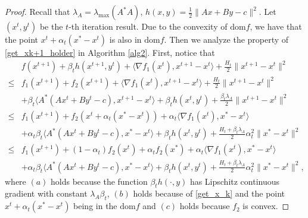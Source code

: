 \documentclass{article}
\numberwithin{equation}{section}
\begin{document}
\begin{proof}
    Recall that $\lambda_{A} = \lambda_{\max}(A^*A)$, $h(x,y) =\frac{1}{2}\|Ax+By-c\rVert^2$.  
    Let $(x^t,y^t)$ be the $t$-th iteration result. Due to the convexity of $\mathrm{dom}f$, 
    we have that the point $x^t + \alpha_t(x^*-x^t)$ is also in $\mathrm{dom}f$.   
    Then we  analyze the property of \eqref{get_xk+1_holder} in Algorithm \ref{alg2}. 
    First, notice that 
    \begin{align}
        &f(x^{t+1})+\beta_th(x^{t+1},y^t) +\langle \nabla f_1(x^t), x^{t+1}-x^t\rangle +\frac{H_t}{2}\|x^{t+1}-x^t\rVert^2 \nonumber \\
        \overset{\mathop{(a)}}{\leq} & f_1(x^{t+1})+f_2(x^{t+1}) +\langle \nabla f_1(x^t), x^{t+1}-x^t\rangle +\frac{H_t}{2}\|x^{t+1}-x^t\rVert^2 
         \nonumber \\
        &+\beta_t\langle A^*(Ax^t+By^t-c), x^{t+1}-x^t\rangle +\beta_th(x^t,y^t) +\frac{\beta_t\lambda_A}{2}\| x^{t+1}-x^t\rVert^2 \nonumber\\
        \overset{\mathop{(b)}}{\leq}& f_1(x^{t+1})+ f_2(x^t+\alpha_t(x^*-x^t)) +\alpha_t\langle \nabla f_1(x^t), x^*-x^t\rangle  \nonumber \\
        &+\alpha_t\beta_t\langle A^*(Ax^t+By^t-c), x^*-x^t\rangle + \beta_th(x^t,y^t) + 
        \frac{H_t+\beta_t\lambda_A}{2}\alpha_t^2\|x^*-x^t\rVert^2 \nonumber \\
        \overset{\mathop{(c)}}{\leq} & f_1(x^{t+1})+ (1-\alpha_t)f_2(x^t)+\alpha_tf_2(x^*) +\alpha_t\langle \nabla f_1(x^t), x^*-x^t\rangle  \nonumber \\
        &+\alpha_t\beta_t\langle A^*(Ax^t+By^t-c), x^*-x^t\rangle + \beta_th(x^t,y^t) + 
        \frac{H_t+\beta_t\lambda_A}{2}\alpha_t^2\|x^*-x^t\rVert^2, \nonumber
    \end{align}
    where $(a)$ holds because the function $\beta_th(\cdot,y)$ has Lipschitz continuous gradient with constant 
    $\lambda_A\beta_t$, $(b)$ holds because of \eqref{get_x_k} 
    and the point $x^t+\alpha_t(x^*-x^t)$ being in the $\mathrm{dom} f$ and $(c)$ holds because $f_2$ is convex.
    

\end{proof}
\end{document}
